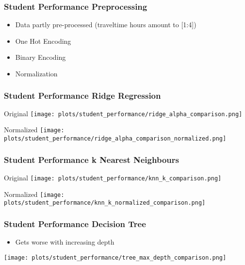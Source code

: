 \documentclass[aspectratio=169]{beamer}
\begin{document}
\begin{frame}{}
\frametitle{Student Performance Preprocessing}
\begin{minipage}{0.99\textwidth}
\begin{itemize}
\item Data partly pre-processed (traveltime hours amount to [1:4])
\item One Hot Encoding
\item Binary Encoding
\item Normalization
\end{itemize}
\end{minipage}
\end{frame}

\begin{frame}{}
\frametitle{Student Performance Ridge Regression}
\begin{minipage}{0.49\textwidth}
    \center Original
    \texttt{[image: plots/student\_performance/ridge\_alpha\_comparison.png]}
\end{minipage}
\begin{minipage}{0.49\textwidth}
    \center Normalized
    \texttt{[image: plots/student\_performance/ridge\_alpha\_comparison\_normalized.png]}
\end{minipage}
\end{frame}

\begin{frame}{}
\frametitle{Student Performance k Nearest Neighbours}
\begin{minipage}{0.49\textwidth}
    \center Original
    \texttt{[image: plots/student\_performance/knn\_k\_comparison.png]}
\end{minipage}
\begin{minipage}{0.49\textwidth}
    \center Normalized
    \texttt{[image: plots/student\_performance/knn\_k\_normalized\_comparison.png]}
\end{minipage}
\end{frame}

\begin{frame}{}
\frametitle{Student Performance Decision Tree}
\begin{minipage}{0.3\textwidth}
\begin{itemize}
\item  Gets worse with increasing depth
\end{itemize}
\end{minipage}
\begin{minipage}{0.69\textwidth}
    \texttt{[image: plots/student\_performance/tree\_max\_depth\_comparison.png]}
\end{minipage}
\end{frame}
\end{document}
